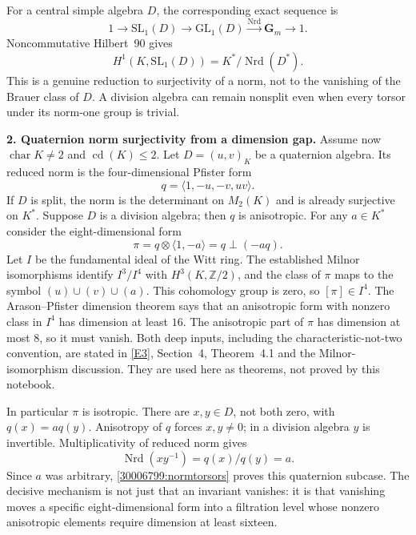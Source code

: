 \documentclass[11pt,a4paper]{article}
\newcommand{\Z}{\mathbb{Z}}
\newcommand{\eref}[2]{\hyperlink{extra:#1:#2}{[E#2]}}
\numberwithin{equation}{section}
\begin{document}
For a central simple algebra $D$, the corresponding exact sequence is
\[
 1\longrightarrow\mathrm{SL}_1(D)\longrightarrow\mathrm{GL}_1(D)
     \xrightarrow{\operatorname{Nrd}}\mathbf G_m\longrightarrow1.
\]
Noncommutative Hilbert~90 gives
\begin{equation}\label{30006799:normtorsors}
 H^1(K,\mathrm{SL}_1(D))=K^*/\operatorname{Nrd}(D^*).
\end{equation}
This is a genuine reduction to surjectivity of a norm, not to the
vanishing of the Brauer class of $D$. A division algebra can remain
nonsplit even when every torsor under its norm-one group is trivial.

\textbf{2. Quaternion norm surjectivity from a dimension gap.}
Assume now $\operatorname{char}K\ne2$ and $\operatorname{cd}(K)\le2$.
Let $D=(u,v)_K$ be a quaternion algebra. Its reduced norm is the
four-dimensional Pfister form
\[
 q=\langle1,-u,-v,uv\rangle.
\]
If $D$ is split, the norm is the determinant on $M_2(K)$ and is already
surjective on $K^*$. Suppose $D$ is a division algebra; then $q$ is
anisotropic. For any $a\in K^*$ consider the eight-dimensional form
\[
 \pi=q\otimes\langle1,-a\rangle=q\perp(-a q).
\]
Let $I$ be the fundamental ideal of the Witt ring. The established
Milnor isomorphisms identify $I^3/I^4$ with
$H^3(K,\Z/2)$, and the class of $\pi$ maps to the symbol
$(u)\cup(v)\cup(a)$. This cohomology group is zero, so $[\pi]\in I^4$.
The Arason--Pfister dimension theorem says that an anisotropic form
with nonzero class in $I^4$ has dimension at least $16$.
The anisotropic part of $\pi$ has dimension at most $8$, so it must
vanish. Both deep inputs, including the characteristic-not-two
convention, are stated in \eref{30006799}{3}, Section~4, Theorem~4.1 and the
Milnor-isomorphism discussion. They are used here as theorems, not
proved by this notebook.

In particular $\pi$ is isotropic. There are $x,y\in D$, not both zero,
with $q(x)=a q(y)$. Anisotropy of $q$ forces $x,y\ne0$; in a division
algebra $y$ is invertible. Multiplicativity of reduced norm gives
\begin{equation}\label{30006799:ratio}
 \operatorname{Nrd}(xy^{-1})=q(x)/q(y)=a.
\end{equation}
Since $a$ was arbitrary, \eqref{30006799:normtorsors} proves this quaternion
subcase. The decisive mechanism is not just that an invariant vanishes:
it is that vanishing moves a specific eight-dimensional form into a
filtration level whose nonzero anisotropic elements require dimension
at least sixteen.
\end{document}
